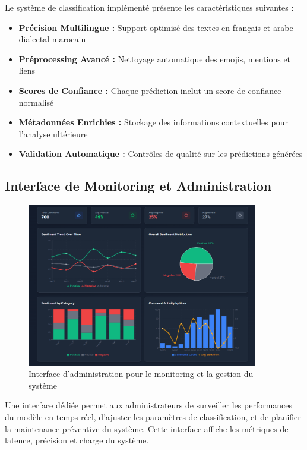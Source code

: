 Le système de classification implémenté présente les caractéristiques suivantes :

\begin{itemize}
    \item \textbf{Précision Multilingue :} Support optimisé des textes en français et arabe dialectal marocain
    \item \textbf{Préprocessing Avancé :} Nettoyage automatique des emojis, mentions et liens
    \item \textbf{Scores de Confiance :} Chaque prédiction inclut un score de confiance normalisé
    \item \textbf{Métadonnées Enrichies :} Stockage des informations contextuelles pour l'analyse ultérieure
    \item \textbf{Validation Automatique :} Contrôles de qualité sur les prédictions générées
\end{itemize}

\subsection{Interface de Monitoring et Administration}

\begin{figure}[H]
\centering
\includegraphics[width=0.9\textwidth]{assets/images/admin-ui.png}
\caption{Interface d'administration pour le monitoring et la gestion du système}
\label{fig:admin-ui}
\end{figure}
Une interface dédiée permet aux administrateurs de surveiller les performances du modèle en temps réel, d'ajuster les paramètres de classification, et de planifier la maintenance préventive du système. Cette interface affiche les métriques de latence, précision et charge du système.

